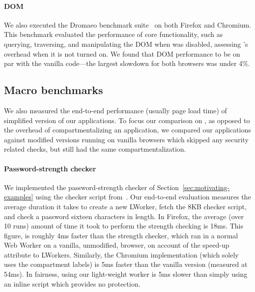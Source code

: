 \paragraph{DOM} We also executed the Dromaeo benchmark suite~\cite{dromaeo} on both
Firefox and Chromium.
%
This benchmark evaluated the performance of core functionality,
such as querying, traversing, and manipulating the DOM when
\sys{} was disabled, assessing \sys{}'s overhead when it is not
turned on.
%
We found that DOM performance to be on par with
the vanilla code---the largest slowdown for both browsers was under
4\%.

\subsection{Macro benchmarks}
\label{sec:eval:macro}

We also measured the end-to-end performance (usually page load time) of
simplified version of our applications.
%
To focus our comparison on \sys{}, as opposed to the overhead of
compartmentalizing an application, we compared our applications
against modified versions running on vanilla browsers which skipped any security
related checks, but still had the same compartmentalization.
%

\paragraph{Password-strength checker}
%
We implemented the password-strength checker of
Section~\ref{sec:motivating-examples} using the checker script
from~\cite{checker1}.
%
Our end-to-end evaluation measures the average duration it takes to
create a new LWorker, fetch the 8KB checker script, and check a password
sixteen characters in length.
%
In Firefox, the average (over 10 runs) amount of time it took to
perform the strength checking is 18ms.
%
This figure, is roughly 4ms faster than the strength checker,
which ran in a normal Web Worker on a vanilla, unmodified, browser,
on account of the speed-up attribute to LWorkers.
%
Similarly, the Chromium implementation (which solely uses the
compartment labels) is 5ms faster than the vanilla version (measured
at 54ms).
%
In fairness, using our light-weight worker is 5ms slower than simply
using an inline script which provides no protection.



